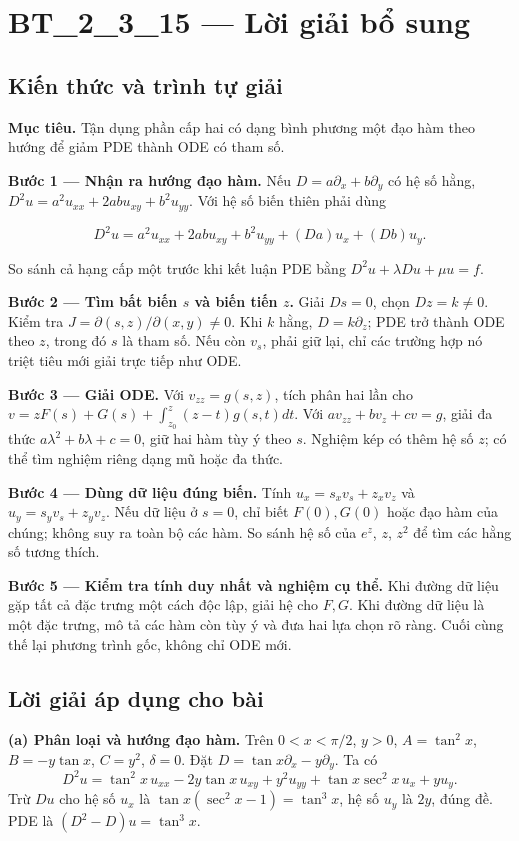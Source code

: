 \documentclass[10pt,a4paper]{article}
\begin{document}
\section*{BT\_2\_3\_15 — Lời giải bổ sung}
\subsection*{Kiến thức và trình tự giải}
\textbf{Mục tiêu.} Tận dụng phần cấp hai có dạng bình phương một đạo hàm theo hướng để giảm PDE thành ODE có tham số.

\textbf{Bước 1 — Nhận ra hướng đạo hàm.} Nếu $D=a\partial_x+b\partial_y$ có hệ số hằng, $D^2u=a^2u_{xx}+2ab u_{xy}+b^2u_{yy}$. Với hệ số biến thiên phải dùng


\[
D^2u=a^2u_{xx}+2ab u_{xy}+b^2u_{yy}+(Da)u_x+(Db)u_y.
\]


So sánh cả hạng cấp một trước khi kết luận PDE bằng $D^2u+\lambda Du+\mu u=f$.

\textbf{Bước 2 — Tìm bất biến $s$ và biến tiến $z$.} Giải $Ds=0$, chọn $Dz=k\ne0$. Kiểm tra $J=\partial(s,z)/\partial(x,y)\ne0$. Khi $k$ hằng, $D=k\partial_z$; PDE trở thành ODE theo $z$, trong đó $s$ là tham số. Nếu còn $v_s$, phải giữ lại, chỉ các trường hợp nó triệt tiêu mới giải trực tiếp như ODE.

\textbf{Bước 3 — Giải ODE.} Với $v_{zz}=g(s,z)$, tích phân hai lần cho $v=zF(s)+G(s)+\int_{z_0}^z(z-t)g(s,t)dt$. Với $a v_{zz}+b v_z+c v=g$, giải đa thức $a\lambda^2+b\lambda+c=0$, giữ hai hàm tùy ý theo $s$. Nghiệm kép có thêm hệ số $z$; có thể tìm nghiệm riêng dạng mũ hoặc đa thức.

\textbf{Bước 4 — Dùng dữ liệu đúng biến.} Tính $u_x=s_xv_s+z_xv_z$ và $u_y=s_yv_s+z_yv_z$. Nếu dữ liệu ở $s=0$, chỉ biết $F(0),G(0)$ hoặc đạo hàm của chúng; không suy ra toàn bộ các hàm. So sánh hệ số của $e^z$, $z$, $z^2$ để tìm các hằng số tương thích.

\textbf{Bước 5 — Kiểm tra tính duy nhất và nghiệm cụ thể.} Khi đường dữ liệu gặp tất cả đặc trưng một cách độc lập, giải hệ cho $F,G$. Khi đường dữ liệu là một đặc trưng, mô tả các hàm còn tùy ý và đưa hai lựa chọn rõ ràng. Cuối cùng thế lại phương trình gốc, không chỉ ODE mới.
\subsection*{Lời giải áp dụng cho bài}
\textbf{(a) Phân loại và hướng đạo hàm.} Trên $0<x<\pi/2$, $y>0$, $A=\tan^2x$, $B=-y\tan x$, $C=y^2$, $\delta=0$. Đặt $D=\tan x\partial_x-y\partial_y$. Ta có
\[D^2u=\tan^2x\,u_{xx}-2y\tan x\,u_{xy}+y^2u_{yy}
+\tan x\sec^2x\,u_x+y u_y.\]
Trừ $Du$ cho hệ số $u_x$ là $\tan x(\sec^2x-1)=\tan^3x$, hệ số $u_y$ là $2y$, đúng đề. PDE là $(D^2-D)u=\tan^3x$.
\end{document}
